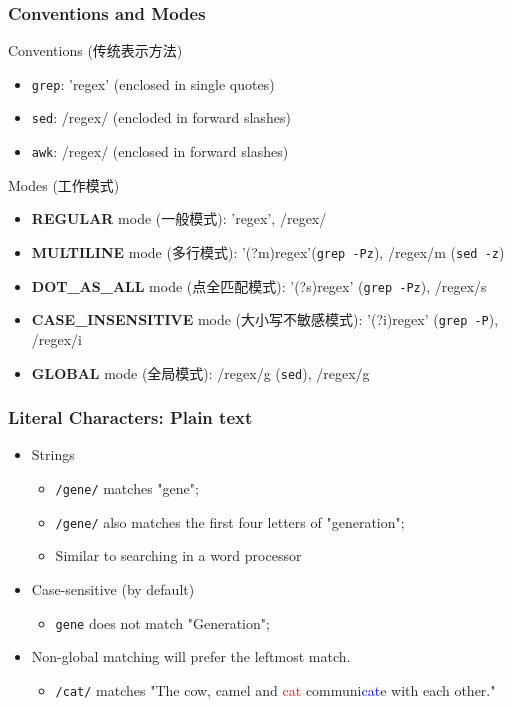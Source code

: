\documentclass[red]{beamer}
\begin{document}
\begin{CJK*}{UTF8}{gbsn}
\begin{frame}
\frametitle{Conventions and Modes}
\begin{block}{\centering Conventions (传统表示方法)}
\begin{itemize}
	\item \texttt{grep}: 'regex' (enclosed in single quotes)
	\item \texttt{sed}: /regex/ (encloded in forward slashes)
	\item \texttt{awk}: /regex/ (enclosed in forward slashes)
\end{itemize}
\end{block}
\begin{block}{\centering Modes (工作模式)}
\begin{itemize}
	\item \textbf{REGULAR} mode (一般模式): 'regex', /regex/
	\item \textbf{MULTILINE} mode (多行模式): '(?m)regex'(\texttt{grep -Pz}), /regex/m (\texttt{sed -z})
	\item \textbf{DOT\_AS\_ALL} mode (点全匹配模式): '(?s)regex' (\texttt{grep -Pz}), /regex/s
	\item \textbf{CASE\_INSENSITIVE} mode (大小写不敏感模式): '(?i)regex' (\texttt{grep -P}), /regex/i
	\item \textbf{GLOBAL} mode (全局模式): /regex/g (\texttt{sed}), /regex/g
\end{itemize}
\end{block}
\end{frame}


\begin{frame}
\frametitle{Literal Characters: Plain text}
\begin{itemize}
	\item Strings
	\begin{itemize}
		\item \texttt{/gene/} matches "gene";
		\item \texttt{/gene/} also matches the first four letters of "generation";
		\item Similar to searching in a word processor
	\end{itemize}
	\item Case-sensitive (by default)
	\begin{itemize}
		\item \texttt{gene} does not match "Generation";
	\end{itemize}
	\item Non-global matching will prefer the leftmost match.
	\begin{itemize}
		\item \texttt{/cat/} matches "The cow, camel and \textcolor{red}{cat} 
			communi\textcolor{blue}{cat}e with each other."
	\end{itemize}
\end{itemize}
\end{frame}



\end{CJK*}
\end{document}
